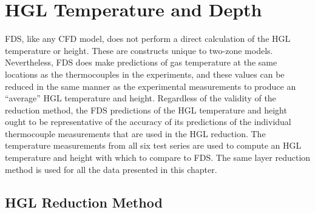 
\chapter{HGL Temperature and Depth}

\label{HGL:Chapter}

FDS, like any CFD model, does not perform a direct calculation of the HGL temperature or height. These are constructs unique to two-zone models. Nevertheless, FDS does make predictions of gas temperature at the same locations as the thermocouples in the experiments, and these values can be reduced in the same manner as the experimental measurements to produce an ``average'' HGL temperature and height.  Regardless of the validity of the reduction method, the FDS predictions of the HGL temperature and height ought to be representative of the accuracy of its predictions of the individual thermocouple measurements that are used in the HGL reduction. The temperature measurements from all six test series are used to compute an HGL temperature and height with which to compare to FDS.  The same layer reduction method is used for all the data presented in this chapter.


\section{HGL Reduction Method}
\label{HGL_Reduction}

